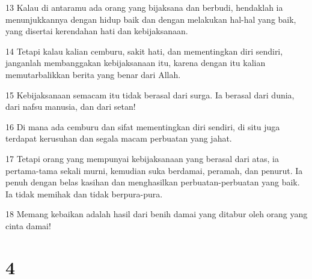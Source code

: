 \par 13 Kalau di antaramu ada orang yang bijaksana dan berbudi, hendaklah ia menunjukkannya dengan hidup baik dan dengan melakukan hal-hal yang baik, yang disertai kerendahan hati dan kebijaksanaan.
\par 14 Tetapi kalau kalian cemburu, sakit hati, dan mementingkan diri sendiri, janganlah membanggakan kebijaksanaan itu, karena dengan itu kalian memutarbalikkan berita yang benar dari Allah.
\par 15 Kebijaksanaan semacam itu tidak berasal dari surga. Ia berasal dari dunia, dari nafsu manusia, dan dari setan!
\par 16 Di mana ada cemburu dan sifat mementingkan diri sendiri, di situ juga terdapat kerusuhan dan segala macam perbuatan yang jahat.
\par 17 Tetapi orang yang mempunyai kebijaksanaan yang berasal dari atas, ia pertama-tama sekali murni, kemudian suka berdamai, peramah, dan penurut. Ia penuh dengan belas kasihan dan menghasilkan perbuatan-perbuatan yang baik. Ia tidak memihak dan tidak berpura-pura.
\par 18 Memang kebaikan adalah hasil dari benih damai yang ditabur oleh orang yang cinta damai!

\chapter{4}

